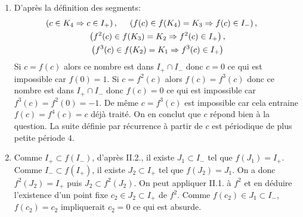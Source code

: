 \begin{enumerate}
  \item D'après la définition des segments:  
\begin{multline*}
  \left( c\in K_4 \Rightarrow c\in I_+\right), \hspace{0.5cm} 
  \left( f(c)\in f(K_4)=K_3 \Rightarrow f(c)\in I_-\right), \hspace{0.5cm}\\
  \left( f^2(c)\in f(K_3)=K_2 \Rightarrow f^2(c)\in I_+\right), \\
  \left( f^3(c)\in f(K_2)=K_1 \Rightarrow f^3(c)\in I_+\right)
\end{multline*}
Si $c=f(c)$ alors ce nombre est dans $I_+\cap I_-$ donc $c=0$ ce qui est impossible car $f(0)=1$.\newline
Si $c=f^2(c)$ alors $f(c)=f^3(c)$ donc ce nombre est dans $I_+\cap I_-$ donc $f(c)=0$ ce qui est impossible car $f^3(c)=f^2(0)=-1$.\newline
De même $c=f^3(c)$ est impossible car cela entraine $f(c)=f^4(c)=c$ déjà traité. On en conclut que $c$ répond bien à la question. La suite définie par  récurrence à partir de $c$ est périodique de plus petite période $4$.
  
  \item Comme $I_+ \subset f(I_-)$, d'après II.2., il existe $J_1\subset I_-$ tel que $f(J_1)=I_+$. Comme $I_-\subset f(I_+)$, il existe $J_2\subset I_+$ tel que $f(J_2)=J_1$. On a donc $f^2(J_2)= I_+$ puis $J_2 \subset f^2(J_2)$. On peut appliquer II.1. à $f^2$ et en déduire l'existence d'un point fixe $c_2\in J_2\subset I_+$ de $f^2$. Comme $f(c_2)\in J_1 \subset I_-$, $f(c_2)=c_2$ impliquerait $c_2=0$ ce qui est absurde. 
  

\end{enumerate}
